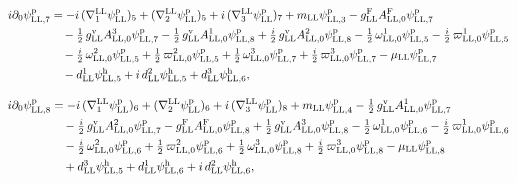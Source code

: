 \documentclass[
  10pt,
]{article}
\begin{document}
\[\begin{aligned}
i\partial_0\psi^{\rm p}_{{\rm LL},7}&=-i\,(\nabla^{\rm LL}_1\psi^{\rm p}_{\rm LL})_5+(\nabla^{\rm LL}_2\psi^{\rm p}_{\rm LL})_5+i\,(\nabla^{\rm LL}_3\psi^{\rm p}_{\rm LL})_7+m_{\rm LL}\psi^{\rm p}_{{\rm LL},3}-g^{\rm F}_{\rm LL}A^{\rm F}_{{\rm LL},0}\psi^{\rm p}_{{\rm LL},7}\\
&\quad -\tfrac{1}{2}\,g^{\rm v}_{\rm LL}A^{3}_{{\rm LL},0}\psi^{\rm p}_{{\rm LL},7}-\tfrac{1}{2}\,g^{\rm v}_{\rm LL}A^{1}_{{\rm LL},0}\psi^{\rm p}_{{\rm LL},8}+\tfrac{i}{2}\,g^{\rm v}_{\rm LL}A^{2}_{{\rm LL},0}\psi^{\rm p}_{{\rm LL},8}-\tfrac{1}{2}\,\omega^{1}_{{\rm LL},0}\psi^{\rm p}_{{\rm LL},5}-\tfrac{i}{2}\,\varpi^{1}_{{\rm LL},0}\psi^{\rm p}_{{\rm LL},5}\\
&\quad -\tfrac{i}{2}\,\omega^{2}_{{\rm LL},0}\psi^{\rm p}_{{\rm LL},5}+\tfrac{1}{2}\,\varpi^{2}_{{\rm LL},0}\psi^{\rm p}_{{\rm LL},5}+\tfrac{1}{2}\,\omega^{3}_{{\rm LL},0}\psi^{\rm p}_{{\rm LL},7}+\tfrac{i}{2}\,\varpi^{3}_{{\rm LL},0}\psi^{\rm p}_{{\rm LL},7}-\mu_{\rm LL}\psi^{\rm p}_{{\rm LL},7}\\
&\quad -d^{1}_{\rm LL}\psi^{\rm h}_{{\rm LL},5}+i\,d^{2}_{\rm LL}\psi^{\rm h}_{{\rm LL},5}+d^{3}_{\rm LL}\psi^{\rm h}_{{\rm LL},6},
\end{aligned}\]

\[\begin{aligned}
i\partial_0\psi^{\rm p}_{{\rm LL},8}&=-i\,(\nabla^{\rm LL}_1\psi^{\rm p}_{\rm LL})_6+(\nabla^{\rm LL}_2\psi^{\rm p}_{\rm LL})_6+i\,(\nabla^{\rm LL}_3\psi^{\rm p}_{\rm LL})_8+m_{\rm LL}\psi^{\rm p}_{{\rm LL},4}-\tfrac{1}{2}\,g^{\rm v}_{\rm LL}A^{1}_{{\rm LL},0}\psi^{\rm p}_{{\rm LL},7}\\
&\quad -\tfrac{i}{2}\,g^{\rm v}_{\rm LL}A^{2}_{{\rm LL},0}\psi^{\rm p}_{{\rm LL},7}-g^{\rm F}_{\rm LL}A^{\rm F}_{{\rm LL},0}\psi^{\rm p}_{{\rm LL},8}+\tfrac{1}{2}\,g^{\rm v}_{\rm LL}A^{3}_{{\rm LL},0}\psi^{\rm p}_{{\rm LL},8}-\tfrac{1}{2}\,\omega^{1}_{{\rm LL},0}\psi^{\rm p}_{{\rm LL},6}-\tfrac{i}{2}\,\varpi^{1}_{{\rm LL},0}\psi^{\rm p}_{{\rm LL},6}\\
&\quad -\tfrac{i}{2}\,\omega^{2}_{{\rm LL},0}\psi^{\rm p}_{{\rm LL},6}+\tfrac{1}{2}\,\varpi^{2}_{{\rm LL},0}\psi^{\rm p}_{{\rm LL},6}+\tfrac{1}{2}\,\omega^{3}_{{\rm LL},0}\psi^{\rm p}_{{\rm LL},8}+\tfrac{i}{2}\,\varpi^{3}_{{\rm LL},0}\psi^{\rm p}_{{\rm LL},8}-\mu_{\rm LL}\psi^{\rm p}_{{\rm LL},8}\\
&\quad +d^{3}_{\rm LL}\psi^{\rm h}_{{\rm LL},5}+d^{1}_{\rm LL}\psi^{\rm h}_{{\rm LL},6}+i\,d^{2}_{\rm LL}\psi^{\rm h}_{{\rm LL},6},
\end{aligned}\]
\end{document}
